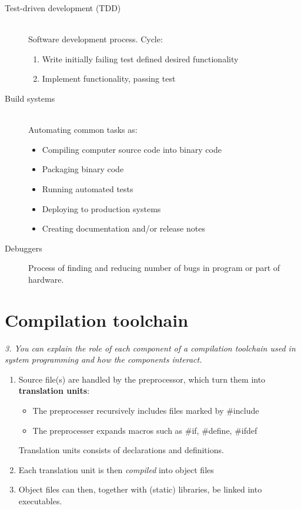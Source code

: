 \documentclass{article}
\begin{document}
\begin{description}
\item[Test-driven development (TDD)] \ \\
Software development process. Cycle:
\begin{enumerate}
\item Write initially failing test defined desired functionality
\item Implement functionality, passing test
\end{enumerate}

\item[Build systems] \ \\
Automating common tasks as:
\begin{itemize}
\item Compiling computer source code into binary code
\item Packaging binary code
\item Running automated tests
\item Deploying to production systems
\item Creating documentation and/or release notes
\end{itemize}

\item[Debuggers] Process of finding and reducing number of bugs in program or part of hardware.
\end{description}


\section{Compilation toolchain}
\label{sec:o3}
\emph{3. You can explain the role of each component of a compilation toolchain used in system programming and how the components interact.}

\begin{enumerate}
	\item Source file(s) are handled by the preprocessor, which turn them into \textbf{translation units}:
	\begin{itemize}
		\item The preprocesser recursively includes files marked by \#include
		\item The preprocesser expands macros such as \#if, \#define, \#ifdef
	\end{itemize}
	Translation units consists of declarations and definitions.
	\item Each translation unit is then \emph{compiled} into object files
	\item Object files can then, together with (static) libraries, be linked into executables.
\end{enumerate}
\end{document}
